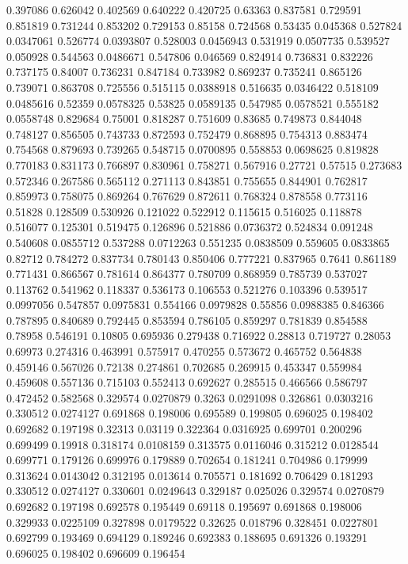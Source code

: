 0.397086 0.626042
0.402569 0.640222
0.420725 0.63363
0.837581 0.729591
0.851819 0.731244
0.853202 0.729153
0.85158 0.724568
0.53435 0.045368
0.527824 0.0347061
0.526774 0.0393807
0.528003 0.0456943
0.531919 0.0507735
0.539527 0.050928
0.544563 0.0486671
0.547806 0.046569
0.824914 0.736831
0.832226 0.737175
0.84007 0.736231
0.847184 0.733982
0.869237 0.735241
0.865126 0.739071
0.863708 0.725556
0.515115 0.0388918
0.516635 0.0346422
0.518109 0.0485616
0.52359 0.0578325
0.53825 0.0589135
0.547985 0.0578521
0.555182 0.0558748
0.829684 0.75001
0.818287 0.751609
0.83685 0.749873
0.844048 0.748127
0.856505 0.743733
0.872593 0.752479
0.868895 0.754313
0.883474 0.754568
0.879693 0.739265
0.548715 0.0700895
0.558853 0.0698625
0.819828 0.770183
0.831173 0.766897
0.830961 0.758271
0.567916 0.27721
0.57515 0.273683
0.572346 0.267586
0.565112 0.271113
0.843851 0.755655
0.844901 0.762817
0.859973 0.758075
0.869264 0.767629
0.872611 0.768324
0.878558 0.773116
0.51828 0.128509
0.530926 0.121022
0.522912 0.115615
0.516025 0.118878
0.516077 0.125301
0.519475 0.126896
0.521886 0.0736372
0.524834 0.091248
0.540608 0.0855712
0.537288 0.0712263
0.551235 0.0838509
0.559605 0.0833865
0.82712 0.784272
0.837734 0.780143
0.850406 0.777221
0.837965 0.7641
0.861189 0.771431
0.866567 0.781614
0.864377 0.780709
0.868959 0.785739
0.537027 0.113762
0.541962 0.118337
0.536173 0.106553
0.521276 0.103396
0.539517 0.0997056
0.547857 0.0975831
0.554166 0.0979828
0.55856 0.0988385
0.846366 0.787895
0.840689 0.792445
0.853594 0.786105
0.859297 0.781839
0.854588 0.78958
0.546191 0.10805
0.695936 0.279438
0.716922 0.28813
0.719727 0.28053
0.69973 0.274316
0.463991 0.575917
0.470255 0.573672
0.465752 0.564838
0.459146 0.567026
0.72138 0.274861
0.702685 0.269915
0.453347 0.559984
0.459608 0.557136
0.715103 0.552413
0.692627 0.285515
0.466566 0.586797
0.472452 0.582568
0.329574 0.0270879
0.3263 0.0291098
0.326861 0.0303216
0.330512 0.0274127
0.691868 0.198006
0.695589 0.199805
0.696025 0.198402
0.692682 0.197198
0.32313 0.03119
0.322364 0.0316925
0.699701 0.200296
0.699499 0.19918
0.318174 0.0108159
0.313575 0.0116046
0.315212 0.0128544
0.699771 0.179126
0.699976 0.179889
0.702654 0.181241
0.704986 0.179999
0.313624 0.0143042
0.312195 0.013614
0.705571 0.181692
0.706429 0.181293
0.330512 0.0274127
0.330601 0.0249643
0.329187 0.025026
0.329574 0.0270879
0.692682 0.197198
0.692578 0.195449
0.69118 0.195697
0.691868 0.198006
0.329933 0.0225109
0.327898 0.0179522
0.32625 0.018796
0.328451 0.0227801
0.692799 0.193469
0.694129 0.189246
0.692383 0.188695
0.691326 0.193291
0.696025 0.198402
0.696609 0.196454
